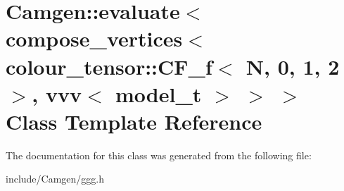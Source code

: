 \hypertarget{a00156}{\section{Camgen\-:\-:evaluate$<$ compose\-\_\-vertices$<$ colour\-\_\-tensor\-:\-:C\-F\-\_\-f$<$ N, 0, 1, 2 $>$, vvv$<$ model\-\_\-t $>$ $>$ $>$ Class Template Reference}
\label{a00156}
}


The documentation for this class was generated from the following file\-:\begin{DoxyCompactItemize}
\item 
include/\-Camgen/ggg.\-h\end{DoxyCompactItemize}

